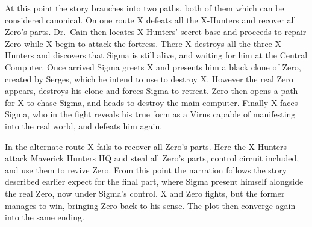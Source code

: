 At this point the story branches into two paths, both of them which can be considered canonical. On one route X defeats all the X-Hunters and recover all Zero's parts. Dr.~Cain then locates X-Hunters' secret base and proceeds to repair  Zero while X begin to attack the fortress. There X destroys all the three X-Hunters and discovers that Sigma is still alive, and waiting for him at the Central Computer. Once arrived Sigma greets X and presents him a black clone of Zero, created by Serges, which he intend to use to destroy X. However the real Zero appears, destroys his clone and forces Sigma to retreat. Zero then opens a path for X to chase Sigma, and heads to destroy the main computer. Finally X faces Sigma, who in the fight reveals his true form as a Virus capable of manifesting into the real world, and defeats him again.

In the alternate route X fails to recover all Zero's parts. Here the X-Hunters attack Maverick Hunters HQ and steal all Zero's parts, control circuit included, and use them to revive Zero. From this point the narration follows the story described earlier expect for the final part, where Sigma present himself alongside the real Zero, now under Sigma's control. X and Zero fights, but the former manages to win, bringing Zero back to his sense. The plot then converge again into the same ending.


